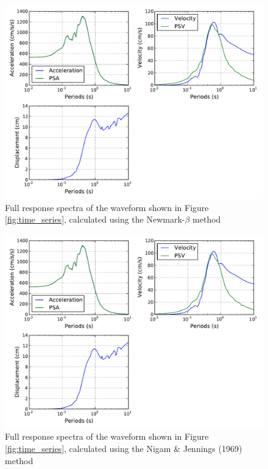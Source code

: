 \begin{figure}[htb]
	\centering
		\includegraphics[width=\textwidth]{./figures/ims/response_newmark_beta.pdf}
	\caption{Full response spectra of the waveform shown in Figure \ref{fig:time_series}, calculated using the Newmark-$\beta$ method}
	\label{fig:newmark_beta}
\end{figure}
\begin{figure}[htb]
	\centering
		\includegraphics[width=\textwidth]{./figures/ims/response_nigam_jennings.pdf}
	\caption{Full response spectra of the waveform shown in Figure \ref{fig:time_series}, calculated using the Nigam \& Jennings (1969) method}
	\label{fig:nigam_jennings}
\end{figure}

